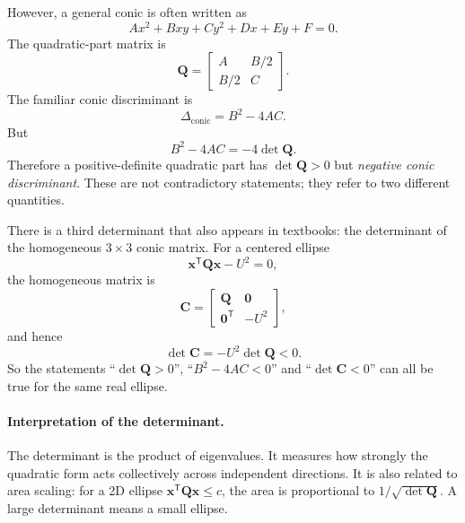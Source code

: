 \documentclass[11pt,a4paper]{article}
\newcommand{\T}{\mathsf{T}}
\newcommand{\vct}[1]{\bm{#1}}
\newcommand{\mat}[1]{\bm{#1}}
\begin{document}
However, a general conic is often written as
\begin{equation}
  A x^2+Bxy+Cy^2+Dx+Ey+F=0.
  \label{eq:general-conic}
\end{equation}
The quadratic-part matrix is
\begin{equation}
  \mat Q=
  \begin{bmatrix}
  A&B/2\\B/2&C
  \end{bmatrix}.
\end{equation}
The familiar conic discriminant is
\begin{equation}
  \Delta_{\mathrm{conic}}=B^2-4AC.
\end{equation}
But
\begin{equation}
  B^2-4AC = -4\det\mat Q.
  \label{eq:conic-disc-det}
\end{equation}
Therefore a positive-definite quadratic part has $\det\mat Q>0$ but \emph{negative conic discriminant}. These are not contradictory statements; they refer to two different quantities.

There is a third determinant that also appears in textbooks: the determinant of the homogeneous $3\times3$ conic matrix. For a centered ellipse
\begin{equation}
  \vct x^\T\mat Q\vct x-U^2=0,
\end{equation}
the homogeneous matrix is
\begin{equation}
  \mat C=
  \begin{bmatrix}
  \mat Q&\vct 0\\
  \vct 0^\T&-U^2
  \end{bmatrix},
\end{equation}
and hence
\begin{equation}
  \det\mat C=-U^2\det\mat Q<0.
\end{equation}
So the statements ``$\det\mat Q>0$'', ``$B^2-4AC<0$'' and ``$\det\mat C<0$'' can all be true for the same real ellipse.

\paragraph{Interpretation of the determinant.}
The determinant is the product of eigenvalues. It measures how strongly the quadratic form acts collectively across independent directions. It is also related to area scaling: for a 2D ellipse $\vct x^\T\mat Q\vct x\le c$, the area is proportional to $1/\sqrt{\det\mat Q}$. A large determinant means a small ellipse.
\end{document}
